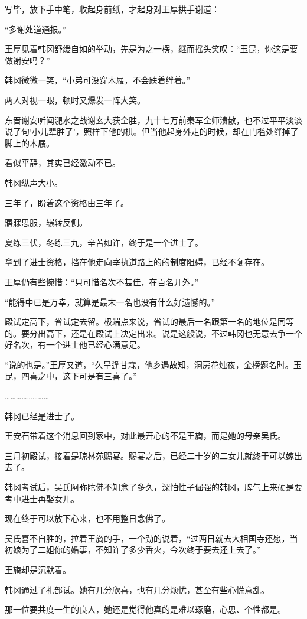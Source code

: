 写毕，放下手中笔，收起身前纸，才起身对王厚拱手谢道：

“多谢处道通报。”

王厚见着韩冈舒缓自如的举动，先是为之一楞，继而摇头笑叹：“玉昆，你这是要做谢安吗？”

韩冈微微一笑，“小弟可没穿木屐，不会跌着绊着。”

两人对视一眼，顿时又爆发一阵大笑。

东晋谢安听闻淝水之战谢玄大获全胜，九十七万前秦军全师溃散，也不过平平淡淡说了句‘小儿辈胜了’，照样下他的棋。但当他起身外走的时候，却在门槛处绊掉了脚上的木屐。

看似平静，其实已经激动不已。

韩冈纵声大小。

三年了，盼着这个资格由三年了。

寤寐思服，辗转反侧。

夏练三伏，冬练三九，辛苦如许，终于是一个进士了。

拿到了进士资格，挡在他走向宰执道路上的的制度阻碍，已经不复存在。

王厚仍有些惋惜：“只可惜名次不甚佳，在百名开外。”

“能得中已是万幸，就算是最末一名也没有什么好遗憾的。”

殿试定高下，省试定去留。极端点来说，省试的最后一名跟第一名的地位是同等的。要分出高下，还是在殿试上决定出来。说是这般说，不过韩冈也无意去争一个好名次，有一个进士他已经心满意足。

“说的也是。”王厚又道，“久旱逢甘霖，他乡遇故知，洞房花烛夜，金榜题名时。玉昆，四喜之中，这下可是有三喜了。”

……………………

韩冈已经是进士了。

王安石带着这个消息回到家中，对此最开心的不是王旖，而是她的母亲吴氏。

三月初殿试，接着是琼林苑赐宴。赐宴之后，已经二十岁的二女儿就终于可以嫁出去了。

韩冈考试后，吴氏阿弥陀佛不知念了多久，深怕性子倔强的韩冈，脾气上来硬是要考中进士再娶女儿。

现在终于可以放下心来，也不用整日念佛了。

吴氏喜不自胜的，拉着王旖的手，一个劲的说着，“过两日就去大相国寺还愿，当初娘为了二姐你的婚事，不知许了多少香火，今次终于要去还上去了。”

王旖却是沉默着。

韩冈通过了礼部试。她有几分欣喜，也有几分烦忧，甚至有些心慌意乱。

那一位要共度一生的良人，她还是觉得他真的是难以琢磨，心思、个性都是。


